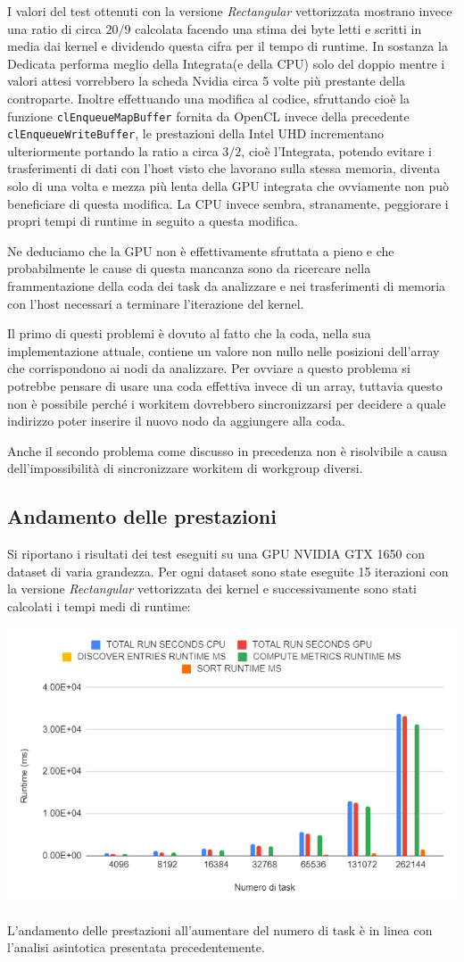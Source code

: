 \documentclass[../relazione.tex]{subfiles}
\begin{document}
I valori del test ottenuti con la versione \textit{Rectangular} vettorizzata mostrano invece una ratio di circa $20/9$ calcolata facendo una stima dei byte letti e scritti in media dai kernel e dividendo questa cifra per il tempo di runtime.
In sostanza la Dedicata performa meglio della Integrata(e della CPU) solo del doppio mentre i valori attesi vorrebbero la scheda Nvidia circa 5 volte più prestante della controparte.
Inoltre effettuando una modifica al codice, sfruttando cioè la funzione \lstinline{clEnqueueMapBuffer} fornita da OpenCL invece della precedente \lstinline{clEnqueueWriteBuffer}, le prestazioni della Intel UHD incrementano ulteriormente portando la ratio a circa $3/2$, cioè l'Integrata, potendo evitare i trasferimenti di dati con l'host visto che lavorano sulla stessa memoria, diventa solo di una volta e mezza più lenta della GPU integrata che ovviamente non può beneficiare di questa modifica.
La CPU invece sembra, stranamente, peggiorare i propri tempi di runtime in seguito a questa modifica.

Ne deduciamo che la GPU non è effettivamente sfruttata a pieno e che probabilmente le cause di questa mancanza sono da ricercare nella frammentazione della coda dei task da analizzare e nei trasferimenti di memoria con l'host necessari a terminare l'iterazione del kernel.

Il primo di questi problemi è dovuto al fatto che la coda, nella sua implementazione attuale, contiene un valore non nullo nelle posizioni dell'array che corrispondono ai nodi da analizzare. Per ovviare a questo problema si potrebbe pensare di usare una coda effettiva invece di un array, tuttavia questo non è possibile perché i workitem dovrebbero sincronizzarsi per decidere a quale indirizzo poter inserire il nuovo nodo da aggiungere alla coda.

Anche il secondo problema come discusso in precedenza non è risolvibile a causa dell'impossibilità di sincronizzare workitem di workgroup diversi.

\subsection{Andamento delle prestazioni}
Si riportano i risultati dei test eseguiti su una GPU NVIDIA GTX 1650 con dataset di varia grandezza. Per ogni dataset sono state eseguite 15 iterazioni con la versione \textit{Rectangular} vettorizzata dei kernel e successivamente sono stati calcolati i tempi medi di runtime:

\begin{center}
\includegraphics[scale=0.8]{images/andamento_prestazioni.png}
\end{center}

L'andamento delle prestazioni all'aumentare del numero di task è in linea con l'analisi asintotica presentata precedentemente. 
\end{document}
